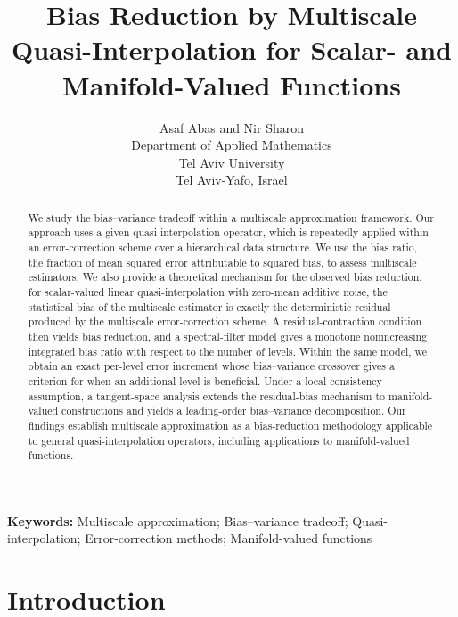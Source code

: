 \documentclass[12pt]{article}
\begin{document}
\title{Bias Reduction by Multiscale Quasi-Interpolation for Scalar- and Manifold-Valued Functions}

\author{
Asaf Abas \quad and \quad Nir Sharon \\
Department of Applied Mathematics\\
Tel Aviv University\\
Tel Aviv-Yafo, Israel
}
\date{}

\maketitle

\begin{abstract}
We study the bias--variance tradeoff within a multiscale approximation framework. Our approach uses a given quasi-interpolation operator, which is repeatedly applied within an error-correction scheme over a hierarchical data structure. We use the bias ratio, the fraction of mean squared error attributable to squared bias, to assess multiscale estimators. We also provide a theoretical mechanism for the observed bias reduction: for scalar-valued linear quasi-interpolation with zero-mean additive noise, the statistical bias of the multiscale estimator is exactly the deterministic residual produced by the multiscale error-correction scheme. A residual-contraction condition then yields bias reduction, and a spectral-filter model gives a monotone nonincreasing integrated bias ratio with respect to the number of levels. Within the same model, we obtain an exact per-level error increment whose bias--variance crossover gives a criterion for when an additional level is beneficial. Under a local consistency assumption, a tangent-space analysis extends the residual-bias mechanism to manifold-valued constructions and yields a leading-order bias--variance decomposition. Our findings establish multiscale approximation as a bias-reduction methodology applicable to general quasi-interpolation operators, including applications to manifold-valued functions.
\end{abstract}

\noindent\textbf{Keywords:}
Multiscale approximation; Bias--variance tradeoff; Quasi-interpolation; Error-correction methods; Manifold-valued functions



\section{Introduction}
\end{document}
